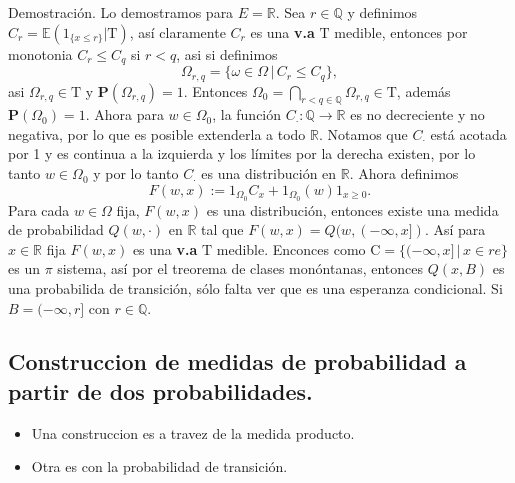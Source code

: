 \documentclass[letterpaper]{article}
\newcommand{\rac}{\ensuremath{ \mathbb Q }}
\newcommand{\prob}{\textbf{P}}
\newcommand{\esp}{\mathbb E}
\newcommand{\dem}{{\noindent \sc Demostraci\'on. }}
\newcommand{\om}{\ensuremath{\Omega}}
\newcommand{\re}{\ensuremath{\mathbb R }}
\begin{document}
\dem Lo demostramos para \(E=\re\). Sea \(r\in\rac\) y definimos \(C_r=\esp(1_{\{x\leq r\}} | \mathrm{T})\), así claramente \(C_r\) es una \textbf{v.a} \(\mathrm{T}\) medible, entonces por monotonia \(C_r\leq C_q\) si \(r<q\), asi si definimos
\[
    \om_{r,q}=\{\omega\in\om\,\vert\,C_{r}\leq C_q\},
\]
\noindent asi \(\om_{r,q}\in\mathrm{T}\) y \(\prob(\om_{r,q})=1\). Entonces \(\om_0=\bigcap_{r < q\in\rac}\om_{r,q}\in\mathrm{T}\), además \(\prob(\om_0)=1\). Ahora para \(w\in\om_0\), la función \(C_{\cdot}:\rac\rightarrow\re\) es no decreciente y no negativa, por lo que es posible extenderla a todo \(\re\). Notamos que \(C_{\cdot}\) está acotada por 1 y es continua a la izquierda y los límites por la derecha existen, por lo tanto \(w\in\om_0\) y por lo tanto \(C_{\cdot}\) es una distribución en \(\re\). Ahora definimos
\[
    F(w,x):=1_{\om_0}C_x+1_{\om_0}(w)1_{x\geq0}.
\]
Para cada \(w\in\om\) fija, \(F(w,x)\) es una distribución, entonces existe una medida de probabilidad \(Q(w,\cdot)\) en \(\re\) tal que \(F(w,x)=Q(w,(-\infty,x])\). Así para \(x\in\re\) fija \(F(w,x)\) es una \textbf{v.a} \(\mathrm{T}\) medible. Enconces como \(\mathrm{C}=\{(-\infty,x]\,\vert\,x\in re\}\) es un \(\pi\) sistema, así por el treorema de clases monóntanas, entonces \(Q(x,B)\) es una probabilida de transición, sólo falta ver que es una esperanza condicional. Si \(B=(-\infty,r]\) con \(r\in\rac\).

\subsection{Construccion de medidas de probabilidad a partir de dos probabilidades.}
\label{sec:orgd3d5bc1}
\begin{itemize}
\item Una construccion es a travez de la medida producto.
\item Otra es con la probabilidad de transición.
\end{itemize}
\end{document}
